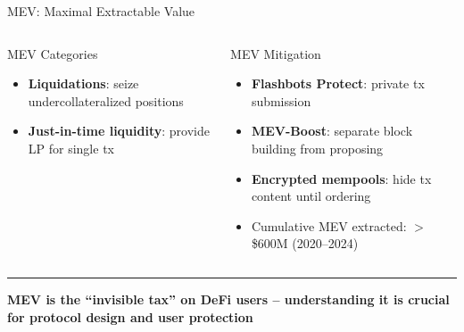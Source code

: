 \documentclass[8pt,aspectratio=169]{beamer}
\newcommand{\bottomnote}[1]{\vfill\vspace{-2mm}\textcolor{mllavender2}{\rule{\textwidth}{0.4pt}}\vspace{1mm}\footnotesize\textbf{#1}}
\begin{document}
\begin{frame}{MEV: Maximal Extractable Value}
\begin{columns}
\begin{block}{MEV Categories}
\begin{itemize}
  \item \textbf{Liquidations}: seize undercollateralized positions
  \item \textbf{Just-in-time liquidity}: provide LP for single tx
\end{itemize}
\end{block}
\begin{block}{MEV Mitigation}
\begin{itemize}\small
  \item \textbf{Flashbots Protect}: private tx submission
  \item \textbf{MEV-Boost}: separate block building from proposing
  \item \textbf{Encrypted mempools}: hide tx content until ordering
  \item Cumulative MEV extracted: $>$\$600M (2020--2024)
\end{itemize}
\end{block}
\end{columns}
\bottomnote{MEV is the ``invisible tax'' on DeFi users -- understanding it is crucial for protocol design and user protection}
\end{frame}
\end{document}
